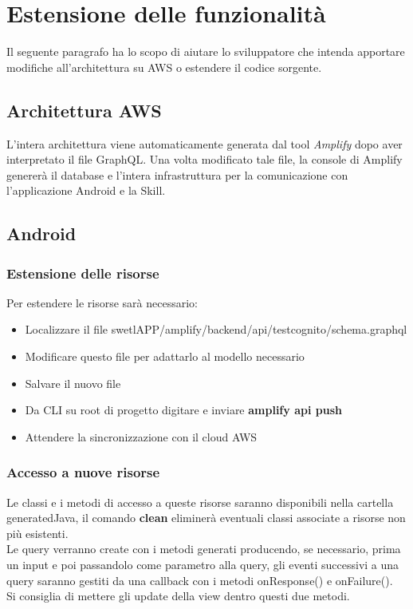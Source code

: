 \pagebreak

\section{Estensione delle funzionalità}
Il seguente paragrafo ha lo scopo di aiutare lo sviluppatore che intenda apportare modifiche all'architettura su AWS o estendere il codice sorgente.

\subsection{Architettura AWS}
L'intera architettura viene automaticamente generata dal tool \emph{Amplify} dopo aver interpretato il file GraphQL. Una volta modificato tale file, la console di Amplify genererà il database e l'intera infrastruttura per la comunicazione con l'applicazione Android e la Skill.\\[0.25cm]

\subsection{Android}
\subsubsection{Estensione delle risorse}
Per estendere le risorse sarà necessario:
\begin{itemize}
\item Localizzare il file swetlAPP/amplify/backend/api/testcognito/schema.graphql
\item Modificare questo file per adattarlo al modello necessario
\item Salvare il nuovo file
\item Da CLI su root di progetto digitare e inviare \textbf{amplify api push}
\item Attendere la sincronizzazione con il cloud AWS
\end{itemize}

\subsubsection{Accesso a nuove risorse}
Le classi e i metodi di accesso a queste risorse saranno disponibili nella cartella generatedJava, il comando \textbf{clean} eliminerà eventuali  classi associate a risorse non più esistenti. \\
Le query verranno create con i metodi generati producendo, se necessario, prima un input e poi passandolo come parametro alla query, gli eventi successivi a una query saranno gestiti da una callback con i metodi onResponse() e onFailure(). \\
Si consiglia di mettere gli update della view dentro questi due metodi.

